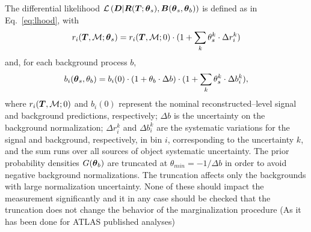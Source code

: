 \documentclass[a4paper]{article}
\begin{document}
The differential likelihood
$\mathcal{L}\left(\boldsymbol{D}{}|\boldsymbol{R}{}(\boldsymbol{T}{};\boldsymbol{\theta{}}{}_s),\boldsymbol{B}{}(\boldsymbol{\theta{}}{}_s,\boldsymbol{\theta{}}{}_b)\right)$
is defined as in Eq.~\ref{eq:lhood}, with
\begin{equation}
r_i(\boldsymbol{T}{},\mathcal{M}{};\boldsymbol{\theta{}}{}_s) =
r_i(\boldsymbol{T}{},\mathcal{M}{};0) \cdot ( 1 + \sum_k
\theta_s^k\cdot\Delta r_i^k )
\end{equation}
and, for each background process $b$,
\begin{equation}
b_i(\boldsymbol{\theta{}}{}_s,\theta_b) =
b_i(0) \cdot ( 1 + \theta_b\cdot\Delta b) \cdot
(1 + \sum_k \theta_s^k\cdot\Delta b_i^k ),
\end{equation}
where $r_i(\boldsymbol{T}{},\mathcal{M}{};0)$ and $b_i(0)$ represent the
nominal reconstructed--level signal and background
predictions, respectively;
$\Delta b$ is the uncertainty on the background normalization;
$\Delta r_i^k$ and $\Delta b_i^k$ are the systematic variations for
the signal and background, respectively, in
bin $i$, corresponding to the uncertainty $k$, and the sum runs over
all sources of object systematic uncertainty.
The prior probability densities $G(\boldsymbol{\theta{}}{}_b)$ are truncated at
$\theta_{min}=-1/\Delta b$ in order to avoid negative background
normalizations. 
The truncation affects only the backgrounds with large normalization 
uncertainty. 
None of these should impact the measurement significantly and it in any case should be checked that the truncation does not change the behavior of the marginalization
procedure (As it has been done for ATLAS published analyses)
\end{document}
